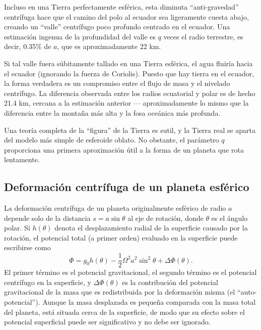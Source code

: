 Incluso en una Tierra perfectamente esférica, esta diminuta ``anti-gravedad'' centrífuga hace que el camino del polo al ecuador sea ligeramente cuesta abajo, creando un ``valle'' centrífugo poco profundo centrado en el ecuador. Una estimación ingenua de la profundidad del valle es $q$ veces el radio terrestre, es decir, 0.35\% de $a$, que es aproximadamente 22 km.

Si tal valle fuera súbitamente tallado en una Tierra esférica, el agua fluiría hacia el ecuador (ignorando la fuerza de Coriolis). Puesto que hay tierra en el ecuador, la forma verdadera es un compromiso entre el flujo de masa y el nivelado centrífugo. La diferencia observada entre los radios ecuatorial y polar es de hecho 21.4 km, cercana a la estimación anterior — aproximadamente lo mismo que la diferencia entre la montaña más alta y la fosa oceánica más profunda.

Una teoría completa de la ``figura'' de la Tierra es sutil, y la Tierra real se aparta del modelo más simple de esferoide oblato. No obstante, el parámetro $q$ proporciona una primera aproximación útil a la forma de un planeta que rota lentamente.

\subsection{Deformación centrífuga de un planeta esférico}

La deformación centrífuga de un planeta originalmente esférico de radio $a$ depende solo de la distancia $s = a\sin\theta$ al eje de rotación, donde $\theta$ es el ángulo polar. Si $h(\theta)$ denota el desplazamiento radial de la superficie causado por la rotación, el potencial total (a primer orden) evaluado en la superficie puede escribirse como
$$ \Phi = g_0 h(\theta) - \frac{1}{2}\Omega^2 a^2\sin^2\theta + \Delta\Phi(\theta). $$
El primer término es el potencial gravitacional, el segundo término es el potencial centrífugo en la superficie, y $\Delta\Phi(\theta)$ es la contribución del potencial gravitacional de la masa que es redistribuida por la deformación misma (el ``auto-potencial''). Aunque la masa desplazada es pequeña comparada con la masa total del planeta, está situada cerca de la superficie, de modo que su efecto sobre el potencial superficial puede ser significativo y no debe ser ignorado.

